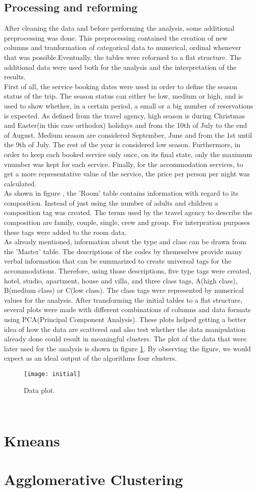 \subsection{Processing and reforming}
After cleaning the data and before performing the analysis, some additional preprocessing was done. This preprocessing contained the creation of new columns and tranformation of categorical data to numerical, ordinal whenever that was possible.Eventually, the tables were reformed to a flat structure. The additional data were used both for the analysis and the interpretation of the results. \\
First of all, the service booking dates were used in order to define the season status of the trip. The season status can either be low, medium or high, and is used to show whether, in a certain period, a small or a big number of reservations is expected. As defined from the travel agency, high season is during Christmas and Easter(in this case orthodox) holidays and from the 10th of July to the end of August. Medium season are considered September, June and from the 1st until the 9th of July. The rest of the year is considered low season. Furthermore, in order to keep each booked service only once, on its final state, only the maximum vnumber was kept for each service. Finally, for the accommodation services, to get a more representative value of the service,  the price per person per night was calculated. \\
As shown in figure , the 'Room' table contains information with regard to its composition. Instead of just using the number of adults and children a composition tag was created. The terms used by the travel agency to describe the composition are family, couple, single, crew and group. For interpration purposes these tags were added to the room data. \\
As already mentioned, information about the type and class can be drawn from the 'Master' table. The descriptions of the codes by themeselves provide many verbal information that can be summarized to create universal tags for the accommodations. Therefore, using those descriptions, five type tags were created, hotel, studio, apartment, house and villa, and three class tags, A(high class), B(medium class) or C(low class). The class tags were represented by numerical values for the analysis.
After transforming the initial tables to a flat structure, several plots were made with different combinations of columns and data formats using PCA(Principal Component Analysis). These plots helped getting a better idea of how the data are scattered and also test whether the data manipulation already done could result in meaningful clusters. The plot of the data that were later used for the analysis is shown in figure \ref{fig:PCA}. By observing the figure, we would expect as an ideal output of the algorithms four clusters.
\begin{figure}[ht]
\centering
\texttt{[image: initial]}
\caption{Data plot.}
\label{fig:PCA}
\end{figure}
\\

\section{Kmeans}
\section{Agglomerative Clustering}
